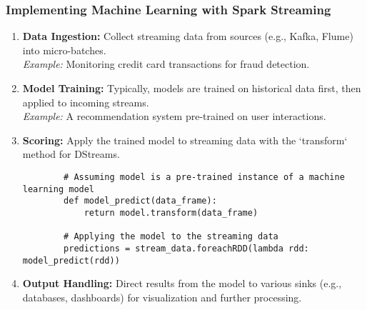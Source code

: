 \documentclass[aspectratio=169]{beamer}
\begin{document}
\begin{frame}[fragile]
    \frametitle{Implementing Machine Learning with Spark Streaming}
    \begin{enumerate}
        \item \textbf{Data Ingestion:} Collect streaming data from sources (e.g., Kafka, Flume) into micro-batches. \\
              \textit{Example:} Monitoring credit card transactions for fraud detection.
        
        \item \textbf{Model Training:} Typically, models are trained on historical data first, then applied to incoming streams. \\
              \textit{Example:} A recommendation system pre-trained on user interactions.
        
        \item \textbf{Scoring:} Apply the trained model to streaming data with the `transform` method for DStreams.
        \begin{lstlisting}
        # Assuming model is a pre-trained instance of a machine learning model
        def model_predict(data_frame):
            return model.transform(data_frame)

        # Applying the model to the streaming data
        predictions = stream_data.foreachRDD(lambda rdd: model_predict(rdd))
        \end{lstlisting}
        
        \item \textbf{Output Handling:} Direct results from the model to various sinks (e.g., databases, dashboards) for visualization and further processing.
    \end{enumerate}
\end{frame}
\end{document}
